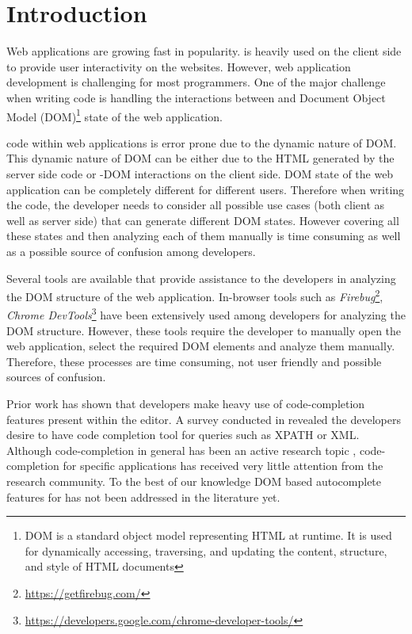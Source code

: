 \section{Introduction}
\label{Sec:Introduction}

Web applications are growing fast in popularity. \javascript is heavily used on the client side to provide user interactivity on the websites. However, web application development is challenging for most programmers. One of the major challenge when writing \javascript code is handling the interactions between \javascript and Document Object Model (DOM)\footnote{DOM is a standard object model representing HTML at runtime. It is used for dynamically accessing, traversing, and updating the content, structure, and style of HTML documents} state of the web application\cite{ocariza2013empirical}.


\javascript code within web applications is error prone due to the dynamic nature of DOM. This dynamic nature of DOM can be either due to the HTML generated by the server side code or \javascript-DOM interactions on the client side. DOM state of the web application can be completely different for different users. Therefore when writing the \javascript code, the developer needs to consider all possible use cases (both client as well as server side) that can generate different DOM states. However covering all these states and then analyzing each of them manually is time consuming as well as a possible source of confusion among developers. 


Several tools are available that provide assistance to the developers in analyzing the DOM structure of the web application. In-browser tools such as \emph{Firebug}\footnote{\url{https://getfirebug.com/}}, \emph{Chrome DevTools}\footnote{\url{https://developers.google.com/chrome-developer-tools/}} have been extensively used among developers for analyzing the DOM structure. However, these tools require the developer to manually open the web application, select the required DOM elements and analyze them manually. Therefore, these processes are time consuming, not user friendly and possible sources of confusion.

Prior work \cite{murphy2006java} has shown that developers make heavy use of code-completion features present within the editor. A survey conducted in \cite{omar2012active} revealed the developers desire to have code completion tool for queries such as XPATH or XML. Although code-completion in general has been an active research topic \cite{robbes2008program, lee2008towards, han2009code, bruch2009learning, brandt2010example, mooty2010calcite, hou2011evaluation}, code-completion for \javascript specific applications has received very little attention from the research community. To the best of our knowledge DOM based autocomplete features for \javascript has not been addressed in the literature yet.


